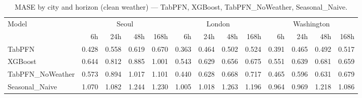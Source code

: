 \begin{table}[ht!]
\centering
\caption{MASE by city and horizon (clean weather) — TabPFN, XGBoost, TabPFN\_NoWeather, Seasonal\_Naive.}
\label{tab:mase_by_city_horizon}
{\small
\setlength{\tabcolsep}{3pt}
\scriptsize
\begin{tabular}{lrrrrrrrrrrrr}
\toprule
Model & \multicolumn{4}{c}{Seoul} & \multicolumn{4}{c}{London} & \multicolumn{4}{c}{Washington} \\
  & 6h & 24h & 48h & 168h & 6h & 24h & 48h & 168h & 6h & 24h & 48h & 168h \\
\midrule
TabPFN & 0.428 & 0.558 & 0.619 & 0.670 & 0.363 & 0.464 & 0.502 & 0.524 & 0.391 & 0.465 & 0.492 & 0.517 \\
XGBoost & 0.644 & 0.812 & 0.885 & 1.001 & 0.543 & 0.629 & 0.656 & 0.675 & 0.551 & 0.639 & 0.681 & 0.659 \\
TabPFN\_NoWeather & 0.573 & 0.894 & 1.017 & 1.101 & 0.440 & 0.628 & 0.668 & 0.717 & 0.465 & 0.596 & 0.631 & 0.679 \\
Seasonal\_Naive & 1.070 & 1.082 & 1.244 & 1.230 & 1.005 & 1.018 & 1.263 & 1.196 & 0.964 & 0.969 & 1.218 & 1.086 \\
\bottomrule
\end{tabular}
}
\end{table}
